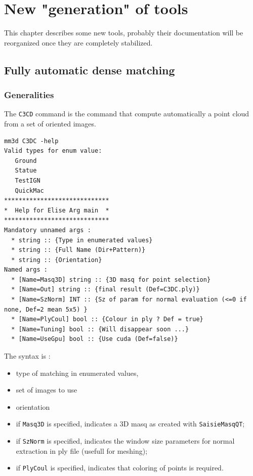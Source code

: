 \chapter{New "generation" of tools}

This chapter describes some new tools, probably their documentation will be reorganized once they are completely stabilized.



\section{Fully automatic dense matching}

\subsection{Generalities}

The {\tt C3CD} command is the command that compute automatically a point cloud from a set of oriented images.

\begin{verbatim}
mm3d C3DC -help
Valid types for enum value:
   Ground
   Statue
   TestIGN
   QuickMac
*****************************
*  Help for Elise Arg main  *
*****************************
Mandatory unnamed args :
  * string :: {Type in enumerated values}
  * string :: {Full Name (Dir+Pattern)}
  * string :: {Orientation}
Named args :
  * [Name=Masq3D] string :: {3D masq for point selection}
  * [Name=Out] string :: {final result (Def=C3DC.ply)}
  * [Name=SzNorm] INT :: {Sz of param for normal evaluation (<=0 if none, Def=2 mean 5x5) }
  * [Name=PlyCoul] bool :: {Colour in ply ? Def = true}
  * [Name=Tuning] bool :: {Will disappear soon ...}
  * [Name=UseGpu] bool :: {Use cuda (Def=false)}
\end{verbatim}


The syntax is :

\begin{itemize}
  \item type of matching in enumerated values,

  \item set of images to use

  \item orientation

  \item if {\tt Masq3D} is specified, indicates a 3D masq as created with {\tt SaisieMasqQT};
  \item if {\tt SzNorm} is specified, indicates the window size parameters for normal extraction in ply file
	(usefull for meshing);
  \item if {\tt PlyCoul} is specified, indicates that coloring of points is required.
\end{itemize}


